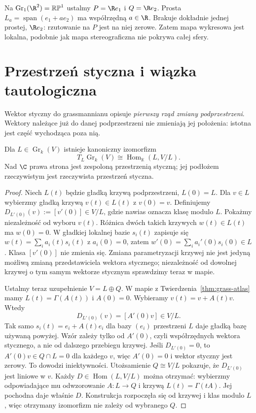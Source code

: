 \begin{przyklad}
Na $\operatorname{Gr}_1(\R^2)=\mathbb{RP}^1$ ustalmy
$P=\R e_1$ i $Q=\R e_2$. Prosta
$L_a=\operatorname{span}(e_1+ae_2)$ ma współrzędną
$a\in\R$. Brakuje dokładnie jednej prostej, $\R e_2$:
rzutowanie na $P$ jest na niej zerowe. Zatem mapa
wykresowa jest lokalna, podobnie jak mapa stereograficzna
nie pokrywa całej sfery.
\end{przyklad}

\section{Przestrzeń styczna i wiązka tautologiczna}
\label{sec:grass-styczna}

Wektor styczny do grassmannianu opisuje \emph{pierwszy
rząd zmiany podprzestrzeni}. Wektory należące już do
danej podprzestrzeni nie zmieniają jej położenia:
istotna jest część wychodząca poza nią.

\begin{twierdzenie}
\label{thm:grass-styczna}
Dla $L\in\operatorname{Gr}_k(V)$ istnieje kanoniczny
izomorfizm
\begin{equation}\label{eq:grass-styczna}
 T_L\operatorname{Gr}_k(V)
  \cong\operatorname{Hom}_{\mathbb K}(L,V/L).
\end{equation}
Nad $\C$ prawa strona jest zespoloną przestrzenią
styczną; jej podłożem rzeczywistym jest rzeczywista
przestrzeń styczna.
\end{twierdzenie}
\begin{proof}
Niech $L(t)$ będzie gładką krzywą podprzestrzeni,
$L(0)=L$. Dla $v\in L$ wybierzmy gładką krzywą
$v(t)\in L(t)$ z $v(0)=v$. Definiujemy
$D_{L'(0)}(v):=[v'(0)]\in V/L$, gdzie nawias oznacza
klasę modulo $L$. Pokażmy niezależność od wyboru
$v(t)$. Różnica dwóch takich krzywych $w(t)\in L(t)$
ma $w(0)=0$. W gładkiej lokalnej bazie $s_i(t)$
zapisuje się $w(t)=\sum_i a_i(t)s_i(t)$ z
$a_i(0)=0$, zatem
$w'(0)=\sum_i a_i'(0)s_i(0)\in L$. Klasa
$[v'(0)]$ nie zmienia się. Zmiana parametryzacji
krzywej nie jest jedyną możliwą zmianą przedstawiciela wektora
stycznego; niezależność od dowolnej krzywej o tym samym wektorze
stycznym sprawdzimy teraz w mapie.

Ustalmy teraz uzupełnienie $V=L\oplus Q$.
W mapie z Twierdzenia~\ref{thm:grass-atlas} mamy
$L(t)=\Gamma(A(t))$ i $A(0)=0$.
Wybieramy $v(t)=v+A(t)v$. Wtedy
\[
 D_{L'(0)}(v)=[A'(0)v]\in V/L.
\]
Tak samo $s_i(t)=e_i+A(t)e_i$ dla bazy $(e_i)$ przestrzeni $L$
daje gładką bazę używaną powyżej. Wzór zależy tylko od $A'(0)$,
czyli współrzędnych wektora stycznego, a nie od dalszego przebiegu krzywej.
Jeśli $D_{L'(0)}=0$, to $A'(0)v\in Q\cap L=0$ dla każdego $v$,
więc $A'(0)=0$ i wektor styczny jest zerowy. To dowodzi iniektywności.
Utożsamienie $Q\cong V/L$ pokazuje, że
$D_{L'(0)}$ jest liniowe w $v$. Każdy
$D\in\operatorname{Hom}(L,V/L)$ można otrzymać:
wybierzmy odpowiadające mu odwzorowanie $A:L\to Q$
i krzywą $L(t)=\Gamma(tA)$. Jej pochodna daje
właśnie $D$. Konstrukcja rozpoczęła się od
krzywej i klas modulo $L$, więc otrzymany
izomorfizm nie zależy od wybranego $Q$.
\end{proof}

